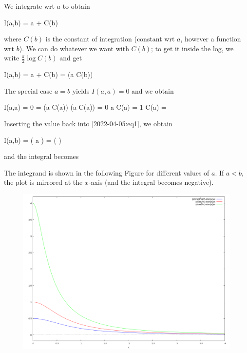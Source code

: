 We integrate wrt $a$ to obtain

\bee
I(a,b) =  \log a + C(b)
\eee

where $C(b)$ is the constant of integration (constant wrt $a$, however a function wrt $b$). We can do whatever we want with $C(b)$; to get it inside the log, we write $\frac{\pi}{2}\log C(b)$ and get


\be\label{2022-04-05:eq1}
I(a,b) =  \log a + \log C(b) =  \log(a C(b))
\ee

The special case $a = b$ yields $I(a,a) = 0$ and we obtain

\bee
I(a,a) = 0 =  \log(a C(a)) \rightarrow \log(a C(a)) = 0 \rightarrow a C(a) = 1 \rightarrow C(a) = 
\eee

Inserting the value back into \eqref{2022-04-05:eq1}, we obtain

\bee
I(a,b) =  \log \left( a  \right) =  \log \left(  \right)
\eee

and the integral becomes

\bee
{}
\eee

The integrand is shown in the following Figure for different values of $a$. If $a < b$, the plot is mirrored at the $x$-axis (and the integral becomes negative).

\begin{figure}[H]
    \includegraphics[scale=0.3]{images/2022-04-05_plot_3.png}
\end{figure}

